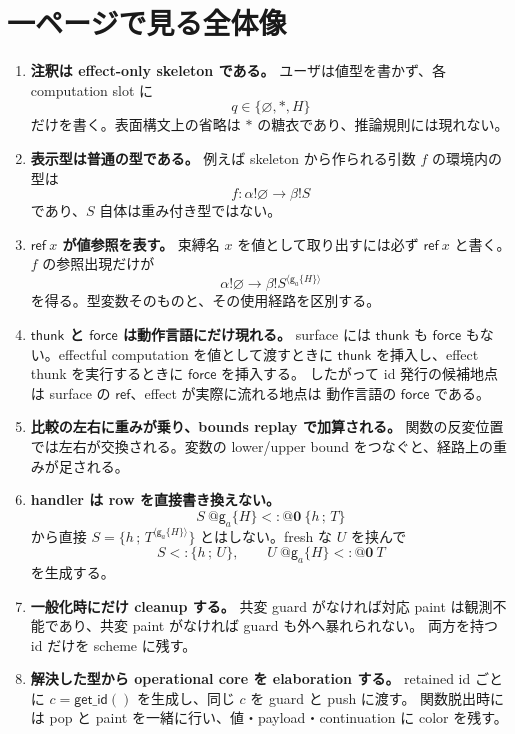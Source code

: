 \documentclass[uplatex,dvipdfmx,a4paper,11pt]{jsarticle}
\makeatletter
\theoremstyle{jpplain}
\newcommand{\subty}{\mathrel{<:}}
\newcommand{\eff}{\mathbin{!}}
\newcommand{\row}[2]{\{#1\,;\,#2\}}
\newcommand{\emptyrow}{\varnothing}
\newcommand{\starann}{\ast}
\newcommand{\gatom}[2]{\mathsf g_{#1}\!\{#2\}}
\newcommand{\zeroW}{\mathbf 0}
\newcommand{\wocc}[2]{#1^{\langle #2\rangle}}
\newcommand{\wsub}[4]{#1\ @#2\mathrel{<:}@#3\ #4}
\newcommand{\thunk}{\mathsf{thunk}}
\newcommand{\force}{\mathsf{force}}
\newcommand{\getid}{\mathsf{get\_id}}
\makeatother
\begin{document}
{\small\tableofcontents}

\section{一ページで見る全体像}

\begin{plainbox}[title={設計の八段階},fonttitle=\bfseries]
\begin{enumerate}[label=\textbf{\arabic*.}]
  \item \textbf{注釈は effect-only skeleton である。}
  ユーザは値型を書かず、各 computation slot に
  \[
    q\in\{\emptyrow,\starann,H\}
  \]
  だけを書く。表面構文上の省略は \(\starann\) の糖衣であり、推論規則には現れない。

  \item \textbf{表示型は普通の型である。}
  例えば skeleton から作られる引数 $f$ の環境内の型は
  \[
    f : \alpha\eff\emptyrow \to \beta\eff S
  \]
  であり、$S$ 自体は重み付き型ではない。

  \item \textbf{\(\mathsf{ref}\ x\) が値参照を表す。}
  束縛名 $x$ を値として取り出すには必ず \(\mathsf{ref}\ x\) と書く。
  $f$ の参照出現だけが
  \[
    \alpha\eff\emptyrow \to \beta\eff\wocc{S}{\gatom a H}
  \]
  を得る。型変数そのものと、その使用経路を区別する。

  \item \textbf{\(\thunk\) と \(\force\) は動作言語にだけ現れる。}
  surface には \(\thunk\) も \(\force\) もない。effectful computation を値として渡すときに
  \(\thunk\) を挿入し、effect thunk を実行するときに \(\force\) を挿入する。
  したがって id 発行の候補地点は surface の \(\mathsf{ref}\)、effect が実際に流れる地点は
  動作言語の \(\force\) である。

  \item \textbf{比較の左右に重みが乗り、bounds replay で加算される。}
  関数の反変位置では左右が交換される。変数の lower/upper bound をつなぐと、経路上の重みが足される。

  \item \textbf{handler は row を直接書き換えない。}
  \[
    \wsub{S}{\gatom a H}{\zeroW}{\row h T}
  \]
  から直接 $S=\row h{\wocc T{\gatom a H}}$ とはしない。fresh な $U$ を挟んで
  \[
    S\subty\row h U,
    \qquad
    \wsub{U}{\gatom a H}{\zeroW}{T}
  \]
  を生成する。

  \item \textbf{一般化時にだけ cleanup する。}
  共変 guard がなければ対応 paint は観測不能であり、共変 paint がなければ guard も外へ暴れられない。
  両方を持つ id だけを scheme に残す。

  \item \textbf{解決した型から operational core を elaboration する。}
  retained id ごとに $c=\getid()$ を生成し、同じ $c$ を guard と push に渡す。
  関数脱出時には pop と paint を一緒に行い、値・payload・continuation に color を残す。
\end{enumerate}
\end{plainbox}
\end{document}
